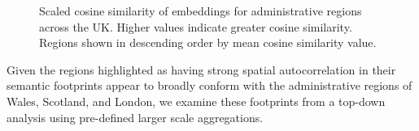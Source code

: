\documentclass[
]{article}
\begin{document}
\begin{figure}


\caption{\label{fig-similarity}Scaled cosine similarity of embeddings
for administrative regions across the UK. Higher values indicate greater
cosine similarity. Regions shown in descending order by mean cosine
similarity value.}

\end{figure}%

Given the regions highlighted as having strong spatial autocorrelation
in their semantic footprints appear to broadly conform with the
administrative regions of Wales, Scotland, and London, we examine these
footprints from a top-down analysis using pre-defined larger scale
aggregations.
\end{document}
